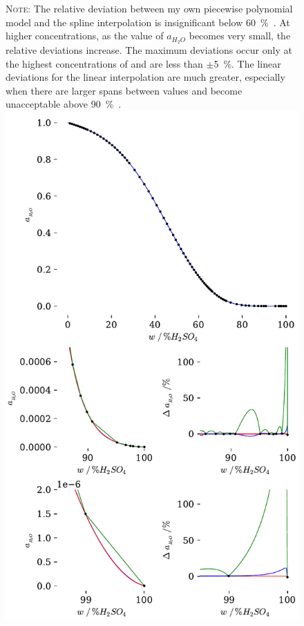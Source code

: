 \documentclass[]{tufte-handout}
\begin{document}
\begin{figure}
{\noindent \textsc{Note}: The relative deviation between my own piecewise polynomial model and the spline interpolation is insignificant below \qty{60}{\percent{}}. At higher concentrations, as the value of $a_{H_2O}$ becomes very small, the relative deviations increase. The maximum deviations occur only at the highest concentrations of  and are less than $\pm$\qty{5}{\percent}. The linear deviations for the linear interpolation are much greater, especially when there are larger spans between values and become unacceptable above \qty{90}{\percent{}}. 
}
 \includegraphics[scale=0.75]{images/plot_D4} 
  \label{fig:plot_D4}
\end{figure}
\end{document}
